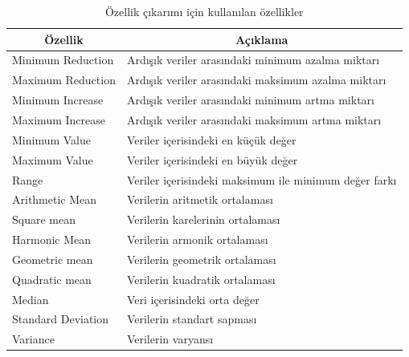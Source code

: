 \begin{table}[!htbp]
\centering
\caption{Özellik çıkarımı için kullanılan özellikler}
\label{my-label}
\begin{tabular}{|l|l|}
\hline
\multicolumn{1}{|c|}{\textbf{Özellik}} & \multicolumn{1}{c|}{\textbf{Açıklama}}                        \\ \hline
Minimum Reduction                      & Ardışık veriler arasındaki minimum azalma miktarı             \\ \hline
Maximum Reduction                      & Ardışık veriler arasındaki maksimum azalma miktarı            \\ \hline
Minimum Increase                       & Ardışık veriler arasındaki minimum artma miktarı              \\ \hline
Maximum Increase                       & Ardışık veriler arasındaki maksimum artma miktarı             \\ \hline
Minimum Value                          & Veriler içerisindeki en küçük değer                           \\ \hline
Maximum Value                          & Veriler içerisindeki en büyük değer                           \\ \hline
Range                                  & Veriler içerisindeki maksimum ile minimum değer farkı         \\ \hline
Arithmetic Mean                        & Verilerin aritmetik ortalaması                                \\ \hline
Square mean                            & Verilerin karelerinin ortalaması                              \\ \hline
Harmonic Mean                          & Verilerin armonik ortalaması                                  \\ \hline
Geometric mean                         & Verilerin geometrik ortalaması                                \\ \hline
Quadratic mean                         & Verilerin kuadratik ortalaması                                \\ \hline
Median                                 & Veri içerisindeki orta değer                                  \\ \hline
Standard Deviation                     & Verilerin standart sapması                                    \\ \hline
Variance                               & Verilerin varyansı                                            \\ \hline

\end{tabular}
\end{table}
